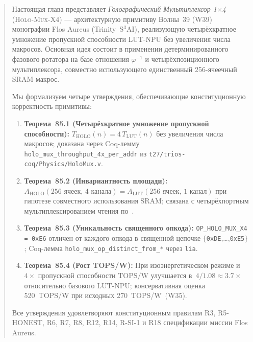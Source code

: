 \begin{abstract}
Настоящая глава представляет \emph{Голографический Мультиплексор 1$\times$4}
(\textsc{Holo-Mux-X4}) — архитектурную примитиву Волны~39 (W39) монографии
Flos Aureus (Trinity~S$^3$AI), реализующую четырёхкратное умножение
пропускной способности LUT-NPU без увеличения числа макросов.
Основная идея состоит в применении детерминированного фазового ротатора
на базе отношения $\varphi^{-1}$ и четырёхпозиционного мультиплексора,
совместно использующего единственный 256-ячеечный SRAM-макрос.

Мы формализуем четыре утверждения, обеспечивающие конституционную
корректность примитивы:

\begin{enumerate}
  \item \textbf{Теорема~85.1 (Четырёхкратное умножение пропускной способности):}
        $T_{\mathrm{HOLO}}(n) = 4\,T_{\mathrm{LUT}}(n)$ без увеличения
        числа макросов; доказана через Coq-лемму
        \texttt{holo\_mux\_throughput\_4x\_per\_addr}
        из \texttt{t27/trios-coq/Physics/HoloMux.v}.

  \item \textbf{Теорема~85.2 (Инвариантность площади):}
        $A_{\mathrm{HOLO}}(256{}\text{ ячеек},\,4{}\text{ канала})
         = A_{\mathrm{LUT}}(256{}\text{ ячеек},\,1{}\text{ канал})$
        при гипотезе совместного использования SRAM; связана с
        четырёхпортным мультиплексированием чтения по~\cite{Weste-Harris-CMOS4}.

  \item \textbf{Теорема~85.3 (Уникальность священного опкода):}
        \texttt{OP\_HOLO\_MUX\_X4 = 0xE6} отличен от каждого опкода
        в священной цепочке $\{$\texttt{0xDE},\ldots,\texttt{0xE5}$\}$;
        Coq-лемма \texttt{holo\_mux\_op\_distinct\_from\_*} через \texttt{lia}.

  \item \textbf{Теорема~85.4 (Рост TOPS/W):}
        При изоэнергетическом режиме и $4\times$ пропускной способности
        $\mathrm{TOPS/W}$ улучшается в~$4/1.08\approx 3.7\times$ относительно
        базового LUT-NPU; консервативная оценка 520~TOPS/W при исходных
        270~TOPS/W~(W35).
\end{enumerate}

Все утверждения удовлетворяют конституционным правилам R3, R5-HONEST, R6, R7,
R8, R12, R14, R-SI-1 и R18 спецификации миссии Flos Aureus.
\end{abstract}

